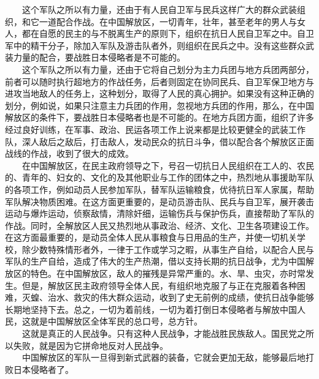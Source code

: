 \documentclass[cn,11pt,chinese]{elegantbook}
\begin{document}
　　这个军队之所以有力量，还由于有人民自卫军与民兵这样广大的群众武装组织，和它一道配合作战。在中国解放区，一切青年，壮年，甚至老年的男人与女人，都在自愿的民主的与不脱离生产的原则下，组织在抗日人民自卫军之中。自卫军中的精干分子，除加入军队及游击队者外，则组织在民兵之中。没有这些群众武装力量的配合，要战胜日本侵略者是不可能的。\\
　　这个军队之所以有力量，还由于它将自己划分为主力兵团与地方兵团两部分，前者可以随时执行超地方的作战任务，后者则固定在协同民兵、自卫军保卫地方与进攻当地敌人的任务上，这种划分，取得了人民的真心拥护。如果没有这种正确的划分，例如说，如果只注意主力兵团的作用，忽视地方兵团的作用，那么，在中国解放区的条件下，要战胜日本侵略者也是不可能的。在地方兵团方面，组织了许多经过良好训练，在军事、政治、民运各项工作上说来都是比较更健全的武装工作队，深人敌后之敌后，打击敌人，发动民众的抗日斗争，借以配合各个解放区正面战线的作战，收到了很大的成效。\\
　　在中国解放区，在民主政府领导之下，号召一切抗日人民组织在工人的、农民的、青年的、妇女的、文化的及其他职业与工作的团体之中，热烈地从事援助军队的各项工作，例如动员人民参加军队，替军队运输粮食，优待抗日军人家属，帮助军队解决物质困难。在这方面更重要的，是动员游击队、民兵与自卫军，展开袭击运动与爆炸运动，侦察敌情，清除奸细，运输伤兵与保护伤兵，直接帮助了军队的作战。同时，全解放区人民又热烈地从事政治、经济、文化、卫生各项建设工作。在这方面最重要的，是动员全体人民从事粮食与日用品的生产，并使一切机关学校，除少数特殊情形者外，一律于工作或学习之暇，从事生产自给，以配合人民与军队的生产自给，造成了伟大的生产热潮，借以支持长期的抗日战争，尤为中国解放区的特色。在中国解放区，敌人的摧残是异常严重的。水、旱、虫灾，亦时常发生。但是，解放区民主政府领导全体人民，有组织地克服了与正在克服着各种困难，灭蝗、治水、救灾的伟大群众运动，收到了史无前例的成绩，使抗日战争能够长期地坚持下去。总之，一切为着前线，一切为着打倒日本侵略者与解放中国人民，这就是中国解放区全体军民的总口号，总方针。\\
　　这就是真正的人民战争。只有这种人民战争，才能战胜民族敌人。国民党之所以失败，就是因为它拼命地反对人民战争。\\
　　中国解放区的军队一旦得到新式武器的装备，它就会更加无敌，能够最后地打败日本侵略者了。\\
\end{document}
